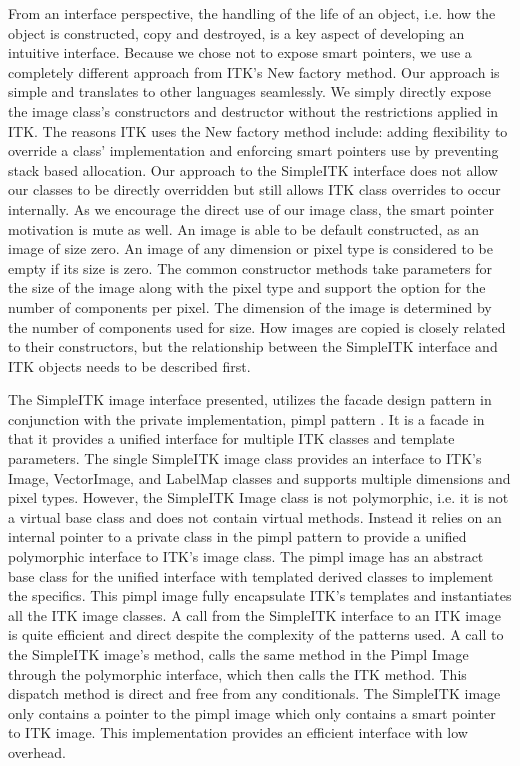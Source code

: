 \documentclass{frontiersMED} %
\begin{document}
From an interface perspective, the handling of the life of an object,
i.e. how the object is constructed, copy and destroyed, is a key
aspect of developing an intuitive interface. Because we chose not to
expose smart pointers, we use a completely different approach from
ITK's New factory method. Our approach is simple and translates to other
languages seamlessly. We simply directly expose the image class's
constructors and destructor without the restrictions applied in
ITK. The reasons ITK uses the New factory method include: adding
flexibility to override a class' implementation and enforcing smart
pointers use by preventing stack based allocation. Our approach to the
SimpleITK interface does not allow our classes to be directly
overridden but still allows ITK class overrides to occur
internally. As we encourage the direct use of our image class, the
smart pointer motivation is mute as well. An image is able to be
default constructed, as an image of size zero. An image of any
dimension or pixel type is considered to be empty if its size is
zero. The common constructor methods take parameters for the size of
the image along with the pixel type and support the option for the
number of components per pixel. The dimension of the image is
determined by the number of components used for size. How images are
copied is closely related to their constructors, but the relationship
between the SimpleITK interface and ITK objects needs to be described
first.

The SimpleITK image interface presented, utilizes the facade design
pattern in conjunction with the private implementation, pimpl pattern
\cite{Sutter1999}. It is a facade in that it provides a unified interface
for multiple ITK classes and template parameters. The single SimpleITK
image class provides an interface to ITK's Image, VectorImage, and
LabelMap classes and supports  multiple dimensions and pixel
types. However, the SimpleITK Image class is not polymorphic, i.e. it
is not a virtual base class and does not contain virtual
methods. Instead it relies on an internal pointer to a private class
in the pimpl pattern to provide a unified polymorphic interface to
ITK's image class. The pimpl image has an abstract base class for the
unified interface with templated derived classes to implement the
specifics. This pimpl image fully encapsulate ITK's templates and
instantiates all the ITK image classes. A call from the SimpleITK
interface to an ITK image is quite efficient and direct despite the
complexity of the patterns used. A call to the SimpleITK image's
method, calls the same method in the Pimpl Image through the
polymorphic interface, which then calls the ITK method. This dispatch
method is direct and free from any conditionals. The SimpleITK image
only contains a pointer to the pimpl image which only contains a smart
pointer to ITK image. This implementation provides an efficient
interface with low overhead.
\end{document}
